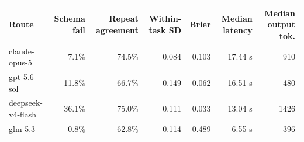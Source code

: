 \begin{tabular}{lrrrrrr}
\toprule
Route & Schema fail & Repeat agreement & Within-task SD & Brier & Median latency & Median output tok. \\
\midrule
claude-opus-5 & 7.1\% & 74.5\% & 0.084 & 0.103 & 17.44 s & 910 \\
gpt-5.6-sol & 11.8\% & 66.7\% & 0.149 & 0.062 & 16.51 s & 480 \\
deepseek-v4-flash & 36.1\% & 75.0\% & 0.111 & 0.033 & 13.04 s & 1426 \\
glm-5.3 & 0.8\% & 62.8\% & 0.114 & 0.489 & 6.55 s & 396 \\
\bottomrule
\end{tabular}

